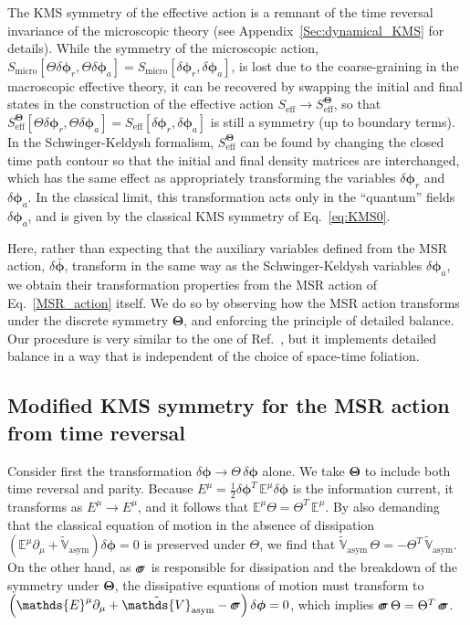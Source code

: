 \documentclass[aps,prd,nofootinbib,amsmath,amssymb,showpacs,longbibliography,singlecolumn,superscriptaddress,notitlepage]{revtex4-1}
\theoremstyle{plain}
\theoremstyle{definition}
\newcommand*{\Scale}[2][4]{\scalebox{#1}{$#2$}}%
\newcommand{\forceds}[1]{\Scale[1.1]{\ensuremath{\mathrlap{{{#1}}}\hspace{1.4pt}#1}}}
\newcommand{\cvec}[1]{\ensuremath{\bm {#1}}}
\newcommand{\cmat}[1]{\ensuremath{\mathds{{#1}}}}
\newcommand{\cmatgreek}[1]{\ensuremath{\forceds{{#1}}}}
\begin{document}
The KMS symmetry of the effective action is a remnant of the time reversal invariance of the microscopic theory (see Appendix~\ref{Sec:dynamical_KMS} for details). 
While the symmetry of the microscopic action, $S_{\mathrm{micro}}[\Theta\delta\cvec{\phi}_r,\Theta\delta\cvec{\phi}_a] = S_{\mathrm{micro}}[\delta\cvec{\phi}_r,\delta\cvec{\phi}_a]$, is lost due to the coarse-graining in the macroscopic effective theory, it can be recovered by swapping the initial and final states in the construction of the effective action $S_{\mathrm{eff}} \to S_{\mathrm{eff}}^{\bm\Theta}$, so that $S_{\mathrm{eff}}^{\bm\Theta}[\Theta\delta\cvec{\phi}_r,\Theta\delta\cvec{\phi}_a] = S_{\mathrm{eff}}[\delta\cvec{\phi}_r,\delta\cvec{\phi}_a]$ is still a symmetry (up to boundary terms). 
In the Schwinger-Keldysh formalism, $S_{\mathrm{eff}}^{\bm\Theta}$ can be found by changing the closed time path contour so that the initial and final density matrices are interchanged, which has the same effect as appropriately transforming the variables $\delta\cvec\phi_r$ and $\delta\cvec\phi_a$. In the classical limit, this transformation acts only in the ``quantum'' fields $\delta\cvec\phi_a$, and is given by the classical KMS symmetry of Eq.~\eqref{eq:KMS0}. 


Here, rather than expecting that the auxiliary variables defined from the MSR action, $\delta \bar{\cvec{\phi}}$, transform in the same way as the Schwinger-Keldysh variables $\delta\cvec\phi_a$, we obtain their transformation properties 
from the MSR action of Eq.\ \eqref{MSR_action} itself. 
We do so by observing how the MSR action transforms under the discrete symmetry $\bm\Theta$, 
and enforcing the principle of detailed balance. 
Our procedure is very similar to the one of Ref.~\cite{Guo:2022ixk}, but it implements detailed balance in a way that is independent of the choice of space-time foliation.  



\subsection{Modified KMS symmetry for the MSR action from time reversal} 

Consider first the transformation  $\delta\cvec{\phi}\to\Theta\,\delta\cvec{\phi}$ alone. We take $\bm\Theta$ to include both time reversal and parity. Because $E^\mu=\frac{1}{2}\delta\cvec{\phi}^T\,\cmat{E}^\mu\delta\cvec{\phi}$ is the information current, it transforms as $E^\mu \to E^\mu$, and it follows that $\cmat{E}^\mu \Theta = \Theta^T\,\cmat{E}^\mu$. By also demanding that the classical equation of motion in the absence of dissipation  $\left(\cmat{E}^\mu\partial_\mu + \tilde{\cmat{V}}_{\mathrm{asym}}\right)\delta\cvec{\phi}=0$ is preserved under $\Theta$, we find that $\tilde{\cmat{V}}_{\mathrm{asym}}\, \Theta = -  \Theta^T\,\tilde{\cmat{V}}_{\mathrm{asym}}$. On the other hand, as $\cmatgreek{\sigma}$ is responsible for dissipation and the breakdown of the symmetry under $\bm\Theta$, the dissipative equations of motion must transform to  $\left(\cmat{E}^\mu\partial_\mu + \tilde{\cmat{V}}_{\mathrm{asym}} - \cmatgreek{\sigma}\right)\delta\cvec{\phi}=0$, which implies $\cmatgreek{\sigma}\, \Theta = \Theta^T\,\cmatgreek{\sigma}$. 
\end{document}
